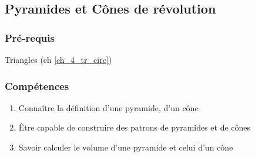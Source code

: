 \subsection{Pyramides et Cônes de révolution}\label{ch_4_pyr}

\subsubsection*{Pré-requis}
Triangles (ch \ref{ch_4_tr_circ})

\subsubsection*{Compétences}
\begin{enumerate}
	\item Connaître la définition d'une pyramide, d'un cône
	\item Être capable de construire des patrons de pyramides et de cônes
	\item Savoir calculer le volume d'une pyramide et celui d'un cône
\end{enumerate}